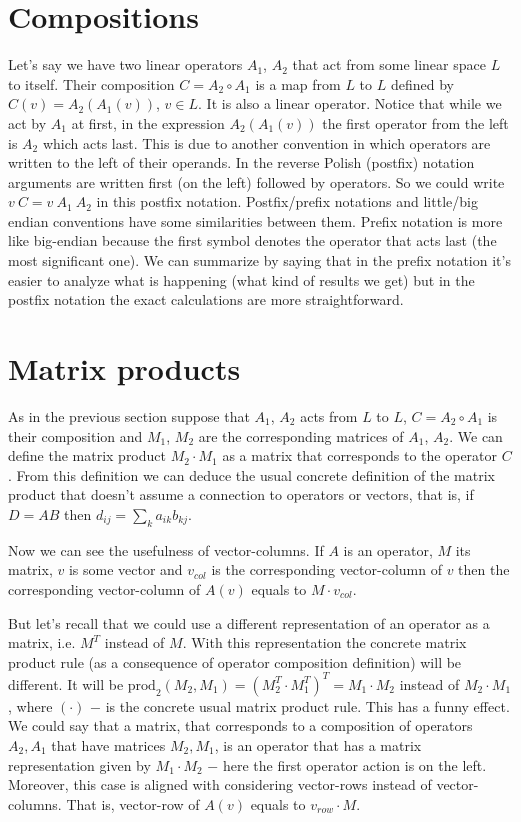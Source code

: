 \documentclass{article}
\begin{document}
\section{Compositions}
Let's say we have two linear operators $A_1$, $A_2$ that act from some linear space $L$ to itself. 
Their composition $C = A_2 \circ A_1$ is a map from $L$ to $L$ defined by $C(v) = A_2(A_1(v))$, $v \in L$. 
It is also a linear operator. 
Notice that while we act by $A_1$ at first, 
in the expression $A_2(A_1(v))$ the first operator from the left is $A_2$ which acts last. 
This is due to another convention in which operators are written to the left of their operands. 
In the reverse Polish (postfix) notation arguments are written first (on the left) followed by operators.
So we could write $v~C = v ~ A_1 ~ A_2$ in this postfix notation. 
Postfix/prefix notations and little/big endian conventions have some similarities between them.  
Prefix notation is more like big-endian because the first symbol denotes the operator that acts last (the most significant one).
We can summarize by saying that in the prefix notation it's easier to analyze what is happening (what kind of results we get)
but in the postfix notation the exact calculations are more straightforward.

\section{Matrix products}
As in the previous section suppose that $A_1$, $A_2$ acts from $L$ to $L$, $C = A_2 \circ A_1$ is their composition 
and $M_1$, $M_2$ are the corresponding matrices of $A_1$, $A_2$. 
We can define the matrix product $M_2 \cdot M_1$ as a matrix that corresponds to the operator $C$. 
From this definition we can deduce the usual concrete definition of the matrix product that doesn't assume a connection to operators or vectors, 
that is, if $D = AB$ then $d_{ij} = \sum_k a_{ik}b_{kj}$. 

Now we can see the usefulness of vector-columns. 
If $A$ is an operator, $M$ its matrix, $v$ is some vector and $v_{col}$ is the corresponding vector-column of $v$ then 
the corresponding vector-column of $A(v)$ equals to $M \cdot v_{col}$. 

But let's recall that we could use a different representation of an operator as a matrix, i.e. $M^T$ instead of $M$. 
With this representation the concrete matrix product rule (as a consequence of operator composition definition) will be different. 
It will be $\textrm{prod}_2(M_2,M_1) = (M_2^T \cdot M_1^T)^T = M_1 \cdot M_2$ instead of $M_2 \cdot M_1$, 
where $(\cdot)$ $-$ is the concrete usual matrix product rule. 
This has a funny effect. 
We could say that a matrix, 
that corresponds to a composition of operators $A_2,A_1$ that have matrices $M_2,M_1$,
is an operator that has a matrix representation given by $M_1 \cdot M_2$ $-$ here the first operator action is on the left. 
Moreover, this case is aligned with considering vector-rows instead of vector-columns. 
That is, vector-row of $A(v)$ equals to $v_{row} \cdot M$.
\end{document}
